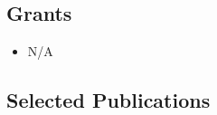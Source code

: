 \documentclass[letterpaper, 11pt]{article}
\begin{document}


\subsection*{Grants}
\begin{itemize}[itemsep=1pt, parsep=0pt,leftmargin=*]
\item[] N/A
\end{itemize}

\subsection*{Selected Publications}
\renewcommand*{\labelenumi}{[P\theenumi]} 
\end{document}
